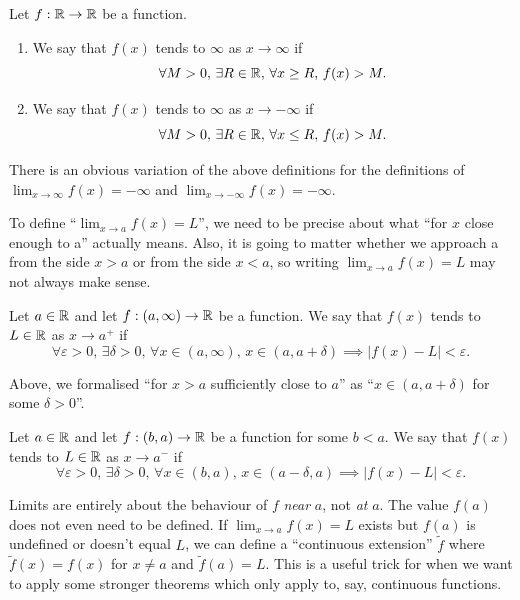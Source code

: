 \documentclass[../analysis1.tex]{subfiles}
\begin{document}
\begin{definition}
    \begin{shaded*}
        Let $f:\mathbb{R}\to\mathbb{R}$ be a function.
        \begin{enumerate}
            \item[1.] We say that $f(x)$ tends to $\infty$ as $x\to\infty$ if
            \[\forall M>0,\,\exists R\in\mathbb{R},\, \forall x\ge R,\, f(x)>M.\] 
            \item[2.] We say that $f(x)$ tends to $\infty$ as $x\to-\infty$ if
            \[\forall M>0,\,\exists R\in\mathbb{R},\, \forall x\le R,\, f(x)>M.\] 
        \end{enumerate}
    \end{shaded*}
\end{definition}
There is an obvious variation of the above definitions for the definitions of $\lim_{x\to\infty}f(x)=-\infty$ and $\lim_{x\to-\infty}f(x)=-\infty$.\par
To define ``$\lim_{x\to a}f(x)=L$'', we need to be precise about what ``for $x$ close enough to a'' actually means. Also, it is going to matter whether we approach a from the side $x>a$ or from the side $x<a$, so writing $\lim_{x\to a}f(x)=L$ may not always make sense.

\begin{definition}
    \begin{shaded*}
        Let $a\in\mathbb{R}$ and let $f:(a,\infty)\to\mathbb{R}$ be a function. We say that $f(x)$ tends to $L\in\mathbb{R}$ as $x\to a^+$ if
        \[\forall\varepsilon>0,\,\exists\delta>0,\,\forall x\in(a,\infty),\, x\in(a,a+\delta)\implies |f(x)-L|<\varepsilon.\]
    \end{shaded*}
\end{definition}
Above, we formalised ``for $x>a$ sufficiently close to $a$'' as ``$x\in (a,a+\delta)$ for some $\delta>0$''.

\begin{definition}
    \begin{shaded*}
        Let $a\in\mathbb{R}$ and let $f:(b,a)\to\mathbb{R}$ be a function for some $b<a$. We say that $f(x)$ tends to $L\in\mathbb{R}$ as $x\to a^-$ if
        \[\forall\varepsilon>0,\,\exists\delta>0,\,\forall x\in(b,a),\, x\in(a-\delta,a)\implies |f(x)-L|<\varepsilon.\] 
    \end{shaded*}
\end{definition}


\begin{remark}
    Limits are entirely about the behaviour of $f$ \textit{near} $a$, not \textit{at} $a$. The value $f(a)$ does not even need to be defined. If $\lim_{x\to a} f(x) = L$ exists but $f(a)$ is undefined or doesn't equal $L$, we can define a ``continuous extension'' $\tilde{f}$ where $\tilde{f}(x) = f(x)$ for $x \neq a$ and $\tilde{f}(a) = L$. This is a useful trick for when we want to apply some stronger theorems which only apply to, say, continuous functions.
\end{remark}
\end{document}
